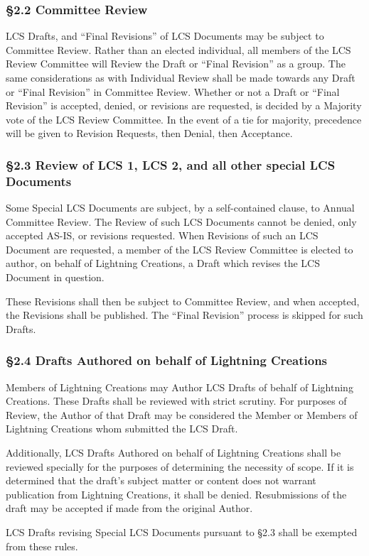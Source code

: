 \hypertarget{committee-review}{%
\subsubsection{§2.2 Committee Review}\label{committee-review}}

LCS Drafts, and ``Final Revisions'' of LCS Documents may be subject to
Committee Review. Rather than an elected individual, all members of the
LCS Review Committee will Review the Draft or ``Final Revision'' as a
group. The same considerations as with Individual Review shall be made
towards any Draft or ``Final Revision'' in Committee Review. Whether or
not a Draft or ``Final Revision'' is accepted, denied, or revisions are
requested, is decided by a Majority vote of the LCS Review Committee. In
the event of a tie for majority, precedence will be given to Revision
Requests, then Denial, then Acceptance.

\hypertarget{review-of-lcs-1-lcs-2-and-all-other-special-lcs-documents}{%
\subsubsection{§2.3 Review of LCS 1, LCS 2, and all other special LCS
Documents}\label{review-of-lcs-1-lcs-2-and-all-other-special-lcs-documents}}

Some Special LCS Documents are subject, by a self-contained clause, to
Annual Committee Review. The Review of such LCS Documents cannot be
denied, only accepted AS-IS, or revisions requested. When Revisions of
such an LCS Document are requested, a member of the LCS Review Committee
is elected to author, on behalf of Lightning Creations, a Draft which
revises the LCS Document in question.

These Revisions shall then be subject to Committee Review, and when
accepted, the Revisions shall be published. The ``Final Revision''
process is skipped for such Drafts.

\hypertarget{drafts-authored-on-behalf-of-lightning-creations}{%
\subsubsection{§2.4 Drafts Authored on behalf of Lightning
Creations}\label{drafts-authored-on-behalf-of-lightning-creations}}

Members of Lightning Creations may Author LCS Drafts of behalf of
Lightning Creations. These Drafts shall be reviewed with strict
scrutiny. For purposes of Review, the Author of that Draft may be
considered the Member or Members of Lightning Creations whom submitted
the LCS Draft.

Additionally, LCS Drafts Authored on behalf of Lightning Creations shall
be reviewed specially for the purposes of determining the necessity of
scope. If it is determined that the draft's subject matter or content
does not warrant publication from Lightning Creations, it shall be
denied. Resubmissions of the draft may be accepted if made from the
original Author.

LCS Drafts revising Special LCS Documents pursuant to §2.3 shall be
exempted from these rules.
